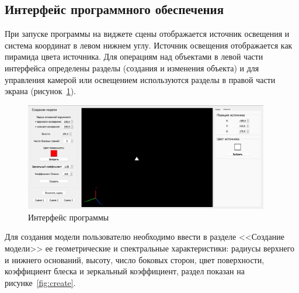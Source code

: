 

%

%

\subsection{Интерфейс программного обеспечения}

При запуске программы на виджете сцены отображается источник освещения и система координат в левом нижнем углу. Источник освещения отображается как пирамида цвета источника.
Для операциям над объектами в левой части интерфейса определены разделы (создания и изменения объекта) и для управления камерой или освещением используются разделы в правой части экрана (рисунок~\ref{fig:example}).

\begin{figure}[h]
	\centering
	\includegraphics[width=0.95\textwidth]{img/examples/example.png}
	\caption{Интерфейс программы}
	\label{fig:example}
\end{figure}

Для создания модели пользователю необходимо ввести в разделе <<Создание модели>> ее геометрические и спектральные характеристики: радиусы верхнего и нижнего оснований, высоту, число боковых сторон, цвет поверхности, коэффициент блеска и зеркальный коэффициент, раздел показан на рисунке~\ref{fig:create}.

